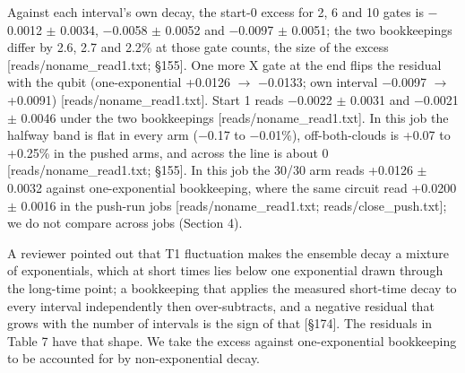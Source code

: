 \documentclass[11pt]{article}
\begin{document}
Against each interval's own decay, the start-0 excess for 2, 6 and 10 gates is \(-\)0.0012 \(\pm\) 0.0034, \(-\)0.0058 \(\pm\) 0.0052 and \(-\)0.0097 \(\pm\) 0.0051; the two bookkeepings differ by 2.6, 2.7 and 2.2\% at those gate counts, the size of the excess {[}reads/noname\_read1.txt; \S{}155{]}. One more X gate at the end flips the residual with the qubit (one-exponential +0.0126 \(\to\) \(-\)0.0133; own interval \(-\)0.0097 \(\to\) +0.0091) {[}reads/noname\_read1.txt{]}. Start 1 reads \(-\)0.0022 \(\pm\) 0.0031 and \(-\)0.0021 \(\pm\) 0.0046 under the two bookkeepings {[}reads/noname\_read1.txt{]}. In this job the halfway band is flat in every arm (\(-\)0.17 to \(-\)0.01\%), off-both-clouds is +0.07 to +0.25\% in the pushed arms, and across the line is about 0 {[}reads/noname\_read1.txt; \S{}155{]}. In this job the 30/30 arm reads +0.0126 \(\pm\) 0.0032 against one-exponential bookkeeping, where the same circuit read +0.0200 \(\pm\) 0.0016 in the push-run jobs {[}reads/noname\_read1.txt; reads/close\_push.txt{]}; we do not compare across jobs (Section 4).

A reviewer pointed out that T1 fluctuation makes the ensemble decay a mixture of exponentials, which at short times lies below one exponential drawn through the long-time point; a bookkeeping that applies the measured short-time decay to every interval independently then over-subtracts, and a negative residual that grows with the number of intervals is the sign of that {[}\S{}174{]}. The residuals in Table 7 have that shape. We take the excess against one-exponential bookkeeping to be accounted for by non-exponential decay.
\end{document}
